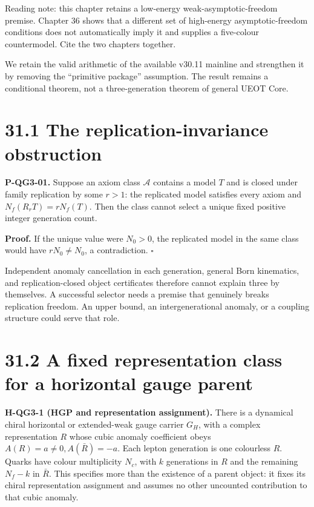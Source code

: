\documentclass[
  11pt,
  oneside]{book}
\begin{document}
Reading note: this chapter retains a low-energy weak-asymptotic-freedom
premise. Chapter 36 shows that a different set of high-energy
asymptotic-freedom conditions does not automatically imply it and
supplies a five-colour countermodel. Cite the two chapters together.

We retain the valid arithmetic of the available v30.11 mainline and
strengthen it by removing the ``primitive package'' assumption. The
result remains a conditional theorem, not a three-generation theorem of
general UEOT Core.

\section{31.1 The replication-invariance obstruction}

\label{p-qg3-01}{}

\textbf{P-QG3-01.} Suppose an axiom class \(\mathcal A\) contains a
model \(T\) and is closed under family replication by some \(r>1\): the
replicated model satisfies every axiom and \(N_f(R_rT)=rN_f(T)\). Then
the class cannot select a unique fixed positive integer generation
count.

\textbf{Proof.} If the unique value were \(N_0>0\), the replicated model
in the same class would have \(rN_0\ne N_0\), a contradiction.
\(\square\)

Independent anomaly cancellation in each generation, general Born
kinematics, and replication-closed object certificates therefore cannot
explain three by themselves. A successful selector needs a premise that
genuinely breaks replication freedom. An upper bound, an
intergenerational anomaly, or a coupling structure could serve that
role.

\section{31.2 A fixed representation class for a horizontal gauge
parent}

\textbf{H-QG3-1 (HGP and representation assignment).} There is a
dynamical chiral horizontal or extended-weak gauge carrier \(G_H\), with
a complex representation \(R\) whose cubic anomaly coefficient obeys
\(A(R)=a\ne0,A(\bar R)=-a\). Each lepton generation is one colourless
\(R\). Quarks have colour multiplicity \(N_c\), with \(k\) generations
in \(R\) and the remaining \(N_f-k\) in \(\bar R\). This specifies more
than the existence of a parent object: it fixes its chiral
representation assignment and assumes no other uncounted contribution to
that cubic anomaly.
\end{document}
